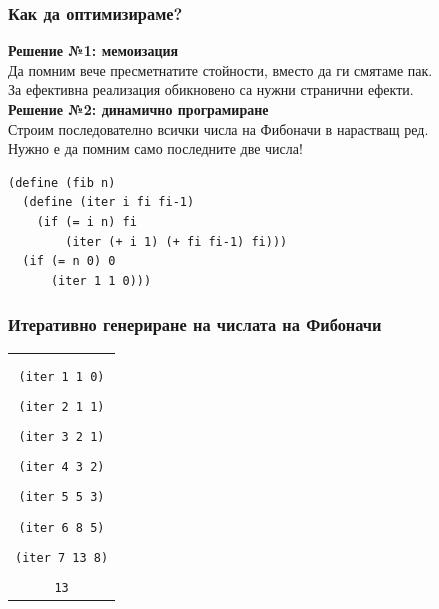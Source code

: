 \documentclass[alsotrans]{beamerswitch}
\begin{document}
\begin{frame}[fragile]
  \frametitle{Как да оптимизираме?}

  \textbf{Решение №1: мемоизация}\\
  Да помним вече пресметнатите стойности, вместо да ги смятаме пак.\\
  \pause
  \alert{За ефективна реализация обикновено са нужни странични ефекти.}\\[1em]
  \pause
  \textbf{Решение №2: динамично програмиране}\\
  Строим последователно всички числа на Фибоначи в нарастващ ред.\\
  \pause
  \alert{Нужно е да помним само последните две числа!}\\
  \pause
\begin{lstlisting}
(define (fib n)
  (define (iter i fi fi-1)
    (if (= i n) fi
        (iter (+ i 1) (+ fi fi-1) fi)))
  (if (= n 0) 0
      (iter 1 1 0)))
\end{lstlisting}
\end{frame}

\begin{frame}
  \frametitle{Итеративно генериране на числата на Фибоначи}

  \small
  \begin{center}
    \begin{tabular}{c}
      \nxt{\tt{(fib 7)}\\
      \nxt{\bda\\
      \tt{(iter 1 1 0)}\\
      \nxt{\bda\\
      \tt{(iter 2 1 1)}\\
      \nxt{\bda\\
      \tt{(iter 3 2 1)}\\
      \nxt{\bda\\
      \tt{(iter 4 3 2)}\\
      \nxt{\bda\\
      \tt{(iter 5 5 3)}\\
      \nxt{\bda\\
      \tt{(iter 6 8 5)}\\
      \nxt{\bda\\
      \tt{(iter 7 13 8)}\\
      \nxt{\bda\\
      \tt{13}}}}}}}}}}
    \end{tabular}
  \end{center}
\end{frame}
\end{document}
